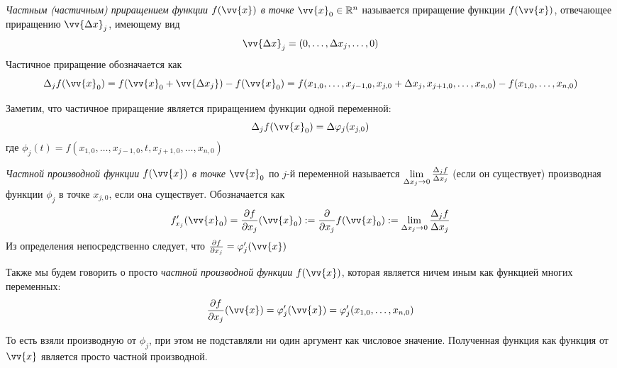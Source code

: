 \begin{definition}
	\textit{Частным (частичным) приращением функции $f(\vv{x})$ в точке} $\vv{x}_0 \in \R^n$ называется приращение функции $f(\vv{x})$, отвечающее 	приращению $\vv{\Delta x}_j$, имеющему вид
	\[
		\vv{\Delta x}_j = (0, \ldots, \Delta x_j, \ldots, 0)
	\]
	Частичное приращение обозначается как
	\[
		\Delta_j f(\vv{x}_0) = f(\vv{x}_0 + \vv{\Delta x_j}) - f(\vv{x}_0) = f(x_{1, 0}, \ldots, x_{j - 1, 0}, x_{j, 0} + \Delta x_j, x_{j + 1, 0}, \ldots, x_{n, 0}) - f(x_{1, 0}, \ldots, x_{n, 0})
	\]
\end{definition}

\begin{note}
	Заметим, что частичное приращение является приращением функции одной переменной:
	\[
		\Delta_j f(\vv{x}_0) = \Delta \phi_j (x_{j, 0})
	\]
	где $\phi_j(t) = f(x_{1, 0}, \ldots, x_{j - 1, 0}, t, x_{j + 1, 0}, \ldots, x_{n, 0})$
\end{note}

\begin{definition}
	\textit{Частной производной функции $f(\vv{x})$ в точке} $\vv{x}_0$ по $j$-й переменной называется $\lim\limits_{ \Delta x_j \to 0}{\frac{\Delta_j f}{\Delta x_j}}$ (если он существует) производная функции $\phi_j$ в точке $x_{j, 0}$, если она существует. Обозначается как 
	\[
		f'_{x_j}(\vv{x}_0) = \pd{f}{x_j} (\vv{x}_0) := \pd{}{x_j}f (\vv{x}_0) := \liml_{ \Delta x_j \to 0}{\frac{\Delta_j f}{\Delta x_j}}
	\]
	Из определения непосредственно следует, что $\pd{f}{x_j} = \phi'_j(\vv{x})$ 
\end{definition}

\begin{definition}
	Также мы будем говорить о просто \textit{частной производной функции} $f(\vv{x})$, которая является ничем иным как функцией многих переменных:
	\[
		\pd{f}{x_j} (\vv{x}) = \phi'_j(\vv{x}) = \phi'_j (x_{1, 0}, \ldots, x_{n, 0})
	\]
\end{definition}

\begin{note}
	То есть взяли производную от $\phi_j$, при этом не подставляли ни один аргумент как числовое значение. Полученная функция как функция от $\vv{x}$ является просто частной производной.
\end{note}

